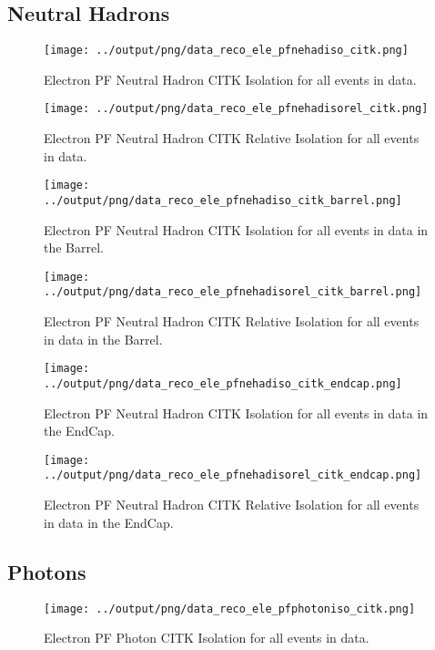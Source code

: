 \documentclass[11pt]{book}
\begin{document}
\subsection{Neutral Hadrons}
\begin{figure}[htb]
\centering
\texttt{[image: ../output/png/data\_reco\_ele\_pfnehadiso\_citk.png]}
\caption{Electron PF Neutral Hadron CITK Isolation for all events in data.}
\label{fig:data_ele_pfnehadiso_citk}
\end{figure}

\begin{figure}[htb]
\centering
\texttt{[image: ../output/png/data\_reco\_ele\_pfnehadisorel\_citk.png]}
\caption{Electron PF Neutral Hadron CITK Relative Isolation for all events in data.}
\label{fig:data_ele_pfnehadisorel_citk}
\end{figure}

\begin{figure}[htb]
\centering
\texttt{[image: ../output/png/data\_reco\_ele\_pfnehadiso\_citk\_barrel.png]}
\caption{Electron PF Neutral Hadron CITK Isolation for all events in data in the Barrel.}
\label{fig:data_ele_pfnehadiso_citk_barrel}
\end{figure}

\begin{figure}[htb]
\centering
\texttt{[image: ../output/png/data\_reco\_ele\_pfnehadisorel\_citk\_barrel.png]}
\caption{Electron PF Neutral Hadron CITK Relative Isolation for all events in data in the Barrel.}
\label{fig:data_ele_pfnehadisorel_citk_barrel}
\end{figure}

\begin{figure}[htb]
\centering
\texttt{[image: ../output/png/data\_reco\_ele\_pfnehadiso\_citk\_endcap.png]}
\caption{Electron PF Neutral Hadron CITK Isolation for all events in data in the EndCap.}
\label{fig:data_ele_pfnehadiso_citk_endcap}
\end{figure}

\begin{figure}[htb]
\centering
\texttt{[image: ../output/png/data\_reco\_ele\_pfnehadisorel\_citk\_endcap.png]}
\caption{Electron PF Neutral Hadron CITK Relative Isolation for all events in data in the EndCap.}
\label{fig:data_ele_pfnehadisorel_citk_endcap}
\end{figure}
\clearpage

\subsection{Photons}
\begin{figure}[htb]
\centering
\texttt{[image: ../output/png/data\_reco\_ele\_pfphotoniso\_citk.png]}
\caption{Electron PF Photon CITK Isolation for all events in data.}
\label{fig:data_ele_pfphotoniso_citk}
\end{figure}
\end{document}
